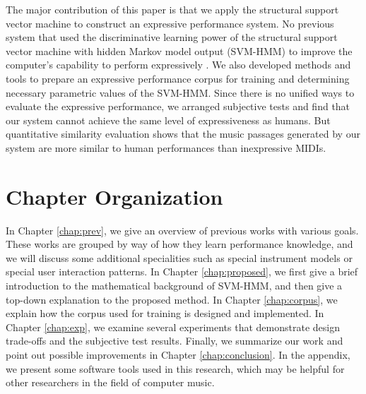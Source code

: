 The major contribution of this paper is that we apply the structural support vector machine to construct an expressive performance system. No previous system that used the discriminative learning power of the structural support vector machine with hidden Markov model output (SVM-HMM) to improve the computer's capability to perform expressively . We also developed methods and tools to prepare an expressive performance corpus for training and determining necessary parametric values of the SVM-HMM. Since there is no unified ways to evaluate the expressive performance, we arranged subjective tests and find that our system cannot achieve the same level of expressiveness as humans. But quantitative similarity evaluation shows that the music passages generated by our system are more similar to human performances than inexpressive MIDIs.
%
%
\section{Chapter Organization}
In Chapter \ref{chap:prev}, we give an overview of previous works with various goals. These works are grouped by way of how they learn performance knowledge, and we will discuss some additional specialities such as special instrument models or special user interaction patterns. In Chapter \ref{chap:proposed}, we first give a brief introduction to the mathematical background of SVM-HMM, and then give a top-down explanation to the proposed method. In Chapter \ref{chap:corpus}, we explain how the corpus used for training is designed and implemented. In Chapter \ref{chap:exp}, we examine several experiments that demonstrate design trade-offs and the subjective test results. Finally, we summarize our work and point out possible improvements in Chapter \ref{chap:conclusion}. In the appendix, we present some software tools used in this research, which may be helpful for other researchers in the field of computer music.
